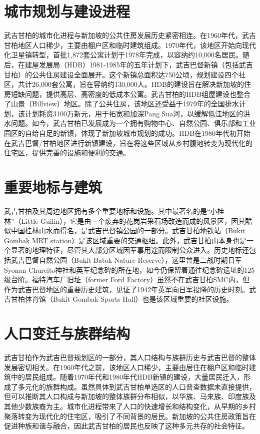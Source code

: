 \documentclass[11pt,a4paper,twoside,openany]{book}
\begin{document}
\section{城市规划与建设进程}
武吉甘柏的城市化进程与新加坡的公共住房发展历史紧密相连。在1960年代，武吉甘柏地区人口稀少，主要由棚户区和临时建筑组成。1970年代，该地区开始向现代化卫星镇转型，首批1,872套公寓计划于1978年完成，以容纳约10,000名居民。随后，在建屋发展局（HDB）1981-1985年的五年计划下，武吉巴督新镇（包括武吉甘柏）的公共住房建设全面展开。这个新镇总面积达750公顷，规划建设四个社区，共计26,000套公寓，旨在容纳约130,000人。HDB的建设旨在解决新加坡的住房短缺问题，提供高层、高密度的低成本公寓。武吉甘柏的HDB组屋建设也整合了山景（Hillview）地区。除了公共住房，该地区还受益于1979年的全国排水计划，该计划耗资3100万新元，用于拓宽和加深Pang Sua河，以缓解低洼地区的洪水问题。如今，武吉甘柏已发展成为一个拥有购物中心、自然公园、俱乐部和工业园区的自给自足的新镇，体现了新加坡城市规划的成功。HDB在1980年代初开始在武吉巴督/甘柏地区进行新镇建设，旨在将这些区域从乡村腹地转变为现代化的住宅区，提供完善的设施和便利的交通。

\section{重要地标与建筑}
武吉甘柏及其周边地区拥有多个重要地标和设施。其中最著名的是“小桂林”（Little Guilin），它是由一个废弃的花岗岩采石场改造而成的风景区，因其酷似中国桂林山水而得名，是武吉巴督镇公园的一部分。武吉甘柏地铁站（Bukit Gombak MRT station）是该区域重要的交通枢纽。此外，武吉甘柏山本身也是一个显著的地理特征，尽管其大部分区域因军事用途而限制公众进入。历史地标还包括武吉巴督自然公园（Bukit Batok Nature Reserve），这里曾是二战时期日军Syonan Chureito神社和英军纪念碑的所在地，如今仍保留着通往纪念碑遗址的125级台阶。福特汽车厂旧址（former Ford Factory）虽然不在武吉甘柏SMC内，但作为武吉巴督地区的重要历史建筑，见证了1942年英军向日军投降的历史时刻。武吉甘柏体育馆（Bukit Gombak Sports Hall）也是该区域重要的社区设施。

\section{人口变迁与族群结构}
武吉甘柏作为武吉巴督规划区的一部分，其人口结构与族群历史与武吉巴督的整体发展密切相关。在1960年代之前，该地区人口稀少，主要由居住在棚户区和临时建筑中的居民组成。随着1970年代和1980年代HDB新镇的建设，大量居民迁入，形成了多元化的族群构成。虽然具体到武吉甘柏单选区的人口普查数据未直接提供，但可以推断其人口构成与新加坡的整体族群分布相似，以华族、马来族、印度族及其他少数族裔为主。城市化进程带来了人口的快速增长和结构变化，从早期的乡村聚落转变为现代化的住宅区，吸引了不同背景的居民。新加坡的公共住房政策旨在促进种族和谐与融合，因此武吉甘柏的居民也反映了这种多元共存的社会特征。
\end{document}
